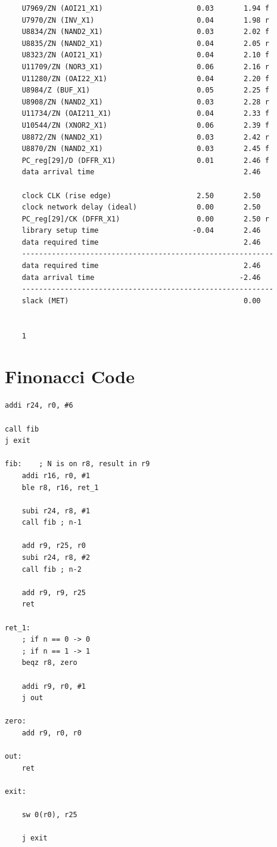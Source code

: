\begin{lstlisting}
	U7969/ZN (AOI21_X1)                      0.03       1.94 f
	U7970/ZN (INV_X1)                        0.04       1.98 r
	U8834/ZN (NAND2_X1)                      0.03       2.02 f
	U8835/ZN (NAND2_X1)                      0.04       2.05 r
	U8323/ZN (AOI21_X1)                      0.04       2.10 f
	U11709/ZN (NOR3_X1)                      0.06       2.16 r
	U11280/ZN (OAI22_X1)                     0.04       2.20 f
	U8984/Z (BUF_X1)                         0.05       2.25 f
	U8908/ZN (NAND2_X1)                      0.03       2.28 r
	U11734/ZN (OAI211_X1)                    0.04       2.33 f
	U10544/ZN (XNOR2_X1)                     0.06       2.39 f
	U8872/ZN (NAND2_X1)                      0.03       2.42 r
	U8870/ZN (NAND2_X1)                      0.03       2.45 f
	PC_reg[29]/D (DFFR_X1)                   0.01       2.46 f
	data arrival time                                   2.46
	
	clock CLK (rise edge)                    2.50       2.50
	clock network delay (ideal)              0.00       2.50
	PC_reg[29]/CK (DFFR_X1)                  0.00       2.50 r
	library setup time                      -0.04       2.46
	data required time                                  2.46
	-----------------------------------------------------------
	data required time                                  2.46
	data arrival time                                  -2.46
	-----------------------------------------------------------
	slack (MET)                                         0.00
	
	
	1
\end{lstlisting}

\newappendix\label{asm_examples}

\section{Finonacci Code}

\begin{lstlisting}[style=mips,caption={Fibonacci DLX Assembly example},label=asm_fibonacci]
addi r24, r0, #6

call fib
j exit

fib:    ; N is on r8, result in r9
    addi r16, r0, #1
    ble r8, r16, ret_1

    subi r24, r8, #1
    call fib ; n-1

    add r9, r25, r0   
    subi r24, r8, #2
    call fib ; n-2

    add r9, r9, r25       
    ret

ret_1:
    ; if n == 0 -> 0
    ; if n == 1 -> 1
    beqz r8, zero

    addi r9, r0, #1
    j out
    
zero:
    add r9, r0, r0

out:
    ret   

exit:

    sw 0(r0), r25

    j exit

\end{lstlisting}

